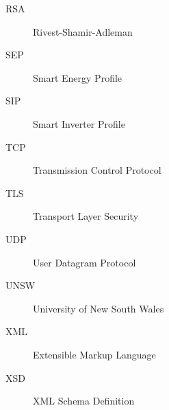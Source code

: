 \begin{description}
\item[RSA] Rivest-Shamir-Adleman
\item[SEP] Smart Energy Profile
\item[SIP] Smart Inverter Profile
\item[TCP] Transmission Control Protocol
\item[TLS] Transport Layer Security
\item[UDP] User Datagram Protocol
\item[UNSW] University of New South Wales
\item[XML] Extensible Markup Language
\item[XSD] XML Schema Definition
\end{description}